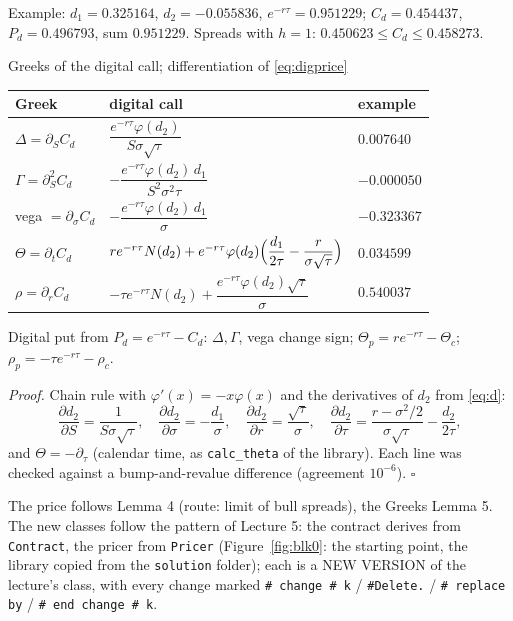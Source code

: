 \documentclass[11pt,a4paper]{article}
\newcommand{\subhead}[1]{\par\medskip\noindent{\large\bfseries #1}\par\smallskip\noindent\ignorespaces}
\newcommand{\DF}{e^{-r\tau}}
\renewcommand{\subhead}[1]{\par\medskip\needspace{8\baselineskip}\noindent{\large\bfseries #1}\par\smallskip\noindent\ignorespaces}
\begin{document}
\noindent Example: $d_1=0.325164$, $d_2=-0.055836$, $\DF=0.951229$; $C_d=0.454437$, $P_d=0.496793$, sum $0.951229$. Spreads with $h=1$: $0.450623\le C_d\le0.458273$.

\begin{lembox}{Greeks of the digital call; differentiation of \eqref{eq:digprice}}
\begin{center}
\renewcommand{\arraystretch}{1.5}
\begin{tabular}{@{}lll@{}}
\toprule
Greek & digital call & example\\
\midrule
$\Delta=\partial_S C_d$ & $\dfrac{\DF\varphi(d_2)}{S\sigma\sqrt\tau}$ & $0.007640$\\
$\Gamma=\partial_S^2C_d$ & $-\dfrac{\DF\varphi(d_2)\,d_1}{S^2\sigma^2\tau}$ & $-0.000050$\\
vega $=\partial_\sigma C_d$ & $-\dfrac{\DF\varphi(d_2)\,d_1}{\sigma}$ & $-0.323367$\\
$\Theta=\partial_tC_d$ & $r\DF N(d_2)+\DF\varphi(d_2)\Bigl(\dfrac{d_1}{2\tau}-\dfrac{r}{\sigma\sqrt\tau}\Bigr)$ & $0.034599$\\
$\rho=\partial_rC_d$ & $-\tau\DF N(d_2)+\dfrac{\DF\varphi(d_2)\sqrt\tau}{\sigma}$ & $0.540037$\\
\bottomrule
\end{tabular}
\end{center}
Digital put from $P_d=\DF-C_d$: $\Delta,\Gamma$, vega change sign; $\Theta_p=r\DF-\Theta_c$; $\rho_p=-\tau\DF-\rho_c$.
\end{lembox}
\noindent\emph{Proof.} Chain rule with $\varphi'(x)=-x\varphi(x)$ and the derivatives of $d_2$ from \eqref{eq:d}:
\[
\frac{\partial d_2}{\partial S}=\frac1{S\sigma\sqrt\tau},\quad \frac{\partial d_2}{\partial\sigma}=-\frac{d_1}{\sigma},\quad \frac{\partial d_2}{\partial r}=\frac{\sqrt\tau}{\sigma},\quad \frac{\partial d_2}{\partial\tau}=\frac{r-\sigma^2/2}{\sigma\sqrt\tau}-\frac{d_2}{2\tau},
\]
and $\Theta=-\partial_\tau$ (calendar time, as \texttt{calc\_theta} of the library). Each line was checked against a bump-and-revalue difference (agreement $10^{-6}$). \hfill$\square$


\subhead{4. Q1: the code.}
The price follows Lemma 4 (route: limit of bull spreads), the Greeks Lemma 5. The new classes follow the pattern of Lecture 5: the contract derives from \texttt{Contract}, the pricer from \texttt{Pricer} (Figure~\ref{fig:blk0}: the starting point, the library copied from the \texttt{solution} folder); each is a NEW VERSION of the lecture's class, with every change marked \texttt{\# change \# k} / \texttt{\#Delete.} / \texttt{\# replace by} / \texttt{\# end change \# k}.
\end{document}
